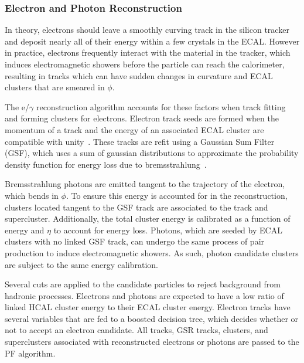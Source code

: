 \subsubsection{Electron and Photon Reconstruction} \label{sec:CMS_reco_egamma}
In theory, electrons should leave a smoothly curving track in the silicon tracker and deposit nearly all of their energy within a few crystals in the ECAL. However in practice, electrons frequently interact with the material in the tracker, which induces electromagnetic showers before the particle can reach the calorimeter, resulting in tracks which can have sudden changes in curvature and ECAL clusters that are smeared in $\phi$.

The e/$\gamma$ reconstruction algorithm accounts for these factors when track fitting and forming clusters for electrons. Electron track seeds are formed when the momentum of a track and the energy of an associated ECAL cluster are compatible with unity~\cite{Sirunyan:PF}. These tracks are refit using a Gaussian Sum Filter (GSF), which uses a sum of gaussian distributions to approximate the probability density function for energy loss due to bremsstrahlung~\cite{Adam_2005}.

Bremsstrahlung photons are emitted tangent to the trajectory of the electron, which bends in $\phi$. To ensure this energy is accounted for in the reconstruction, clusters located tangent to the GSF track are associated to the track and supercluster. Additionally, the total cluster energy is calibrated as a function of energy and $\eta$ to account for energy loss. Photons, which are seeded by ECAL clusters with no linked GSF track, can undergo the same process of pair production to induce electromagnetic showers. As such, photon candidate clusters are subject to the same energy calibration.

Several cuts are applied to the candidate particles to reject background from hadronic processes. Electrons and photons are expected to have a low ratio of linked HCAL cluster energy to their ECAL cluster energy. Electron tracks have several variables that are fed to a boosted decision tree, which decides whether or not to accept an electron candidate. All tracks, GSR tracks, clusters, and superclusters associated with reconstructed electrons or photons are passed to the PF algorithm.

